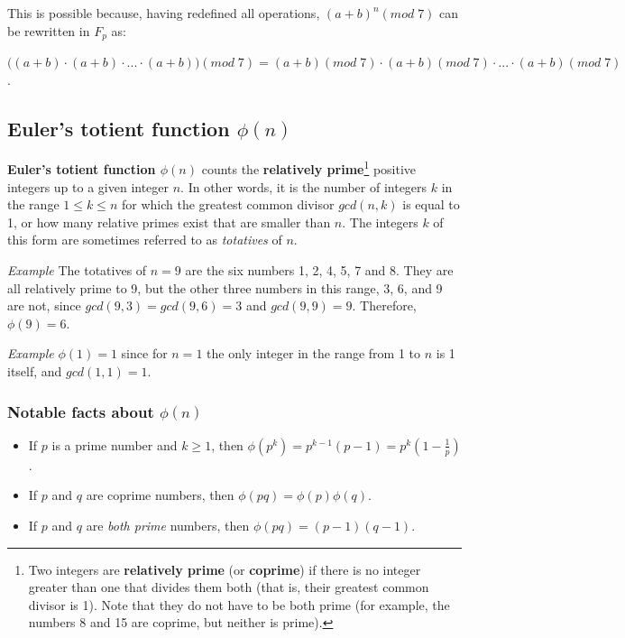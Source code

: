 This is possible because, having redefined all operations, $(a + b)^n (mod\; 7)$ can be rewritten in $F_p$ as:
\begin{center}
$\big((a + b) \cdot (a + b) \cdot ... \cdot (a + b)\big) (mod\; 7) = (a + b) (mod\; 7) \cdot (a + b) (mod\; 7) \cdot ... \cdot (a + b) (mod\; 7)$.
\end{center}


\subsection{Euler's totient function $\phi(n)$}
\textbf{Euler's totient function $\phi(n)$} counts the \textbf{relatively prime}\footnote{Two integers are \textbf{relatively prime} (or \textbf{coprime}) if there is no integer greater than one that divides them both (that is, their greatest common divisor is 1). Note that they do not have to be both prime (for example, the numbers 8 and 15 are coprime, but neither is prime).} positive integers up to a given integer $n$. In other words, it is the number of integers $k$ in the range $1 \leq k \leq n$ for which the greatest common divisor $gcd(n, k)$ is equal to 1, or how many relative primes exist that are smaller than $n$. The integers $k$ of this form are sometimes referred to as \textit{totatives} of $n$.

\vspace{0.5em}

\emph{Example} The totatives of $n = 9$ are the six numbers 1, 2, 4, 5, 7 and 8. They are all relatively prime to 9, but the other three numbers in this range, 3, 6, and 9 are not, since $gcd(9, 3) = gcd(9, 6) = 3$ and $gcd(9, 9) = 9$. Therefore, $\phi(9) = 6$.

\vspace{0.5em}

\emph{Example} $\phi(1) = 1$ since for $n = 1$ the only integer in the range from 1 to $n$ is 1 itself, and $gcd(1, 1) = 1$.


\subsubsection{Notable facts about $\phi(n)$}
\begin{itemize}
    \item If $p$ is a prime number and $k \geq 1$, then $\phi(p^k) = p^{k-1}(p - 1) = p^k(1 - \frac{1}{p})$.
    \item If $p$ and $q$ are coprime numbers, then $\phi(pq) = \phi(p)\phi(q)$.
    \item If $p$ and $q$ are \textit{both prime} numbers, then $\phi(pq) = (p-1)(q-1)$.
\end{itemize}

